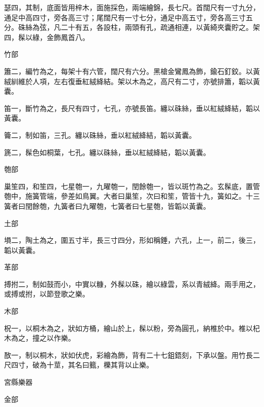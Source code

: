 \begin{pinyinscope}
 瑟四，其制，底面皆用梓木，面施採色，兩端繪錦，長七尺。首闊尺有一寸九分，通足中高四寸，旁各高三寸；尾闊尺有一寸七分，通足中高五寸，旁各高三寸五分。硃絲為弦，凡二十有五，各設柱，兩頭有孔，疏通相連，以黃綺夾囊貯之。架四，髹以綠，金飾鳳首八。



 竹部



 簫二，編竹為之，每架十有六管，闊尺有六分。黑槍金鸞鳳為飾，鍮石釘鉸。以黃絨紃維於人項，左右復垂紅絨絳結。架以木為之，高尺有二寸，亦號排簫，韜以黃囊。



 笛一，斷竹為之，長尺有四寸，七孔，亦號長笛。纏以硃絲，垂以紅絨絳結，韜以黃囊。



 籥二，制如笛，三孔。纏以硃絲，垂以紅絨絳結，韜以黃囊。



 篪二，髹色如桐葉，七孔。纏以硃絲，垂以紅絨絳結，韜以黃囊。



 匏部



 巢笙四，和笙四，七星匏一，九曜匏一，閏餘匏一，皆以斑竹為之。玄髹底，置管匏中，施簧管端，參差如鳥翼。大者曰巢笙，次曰和笙，管皆十九，簧如之。十三簧者曰閏餘匏，九簧者曰九曜匏，七簧者曰七星匏，皆韜以黃囊。



 土部



 塤二，陶土為之，圍五寸半，長三寸四分，形如稱錘，六孔，上一，前二，後三，韜以黃囊。



 革部



 搏拊二，制如鼓而小，中實以糠，外髹以硃，繪以綠雲，系以青絨絳。兩手用之，或搏或拊，以節登歌之樂。



 木部



 柷一，以桐木為之，狀如方桶，繪山於上，髹以粉，旁為圓孔，納椎於中。椎以杞木為之，撞之以作樂。



 敔一，制以桐木，狀如伏虎，彩繪為飾，背有二十七鉏鋙刻，下承以盤。用竹長二尺四寸，破為十莖，其名曰籈，櫟其背以止樂。



 宮縣樂器



 金部




\end{pinyinscope}
